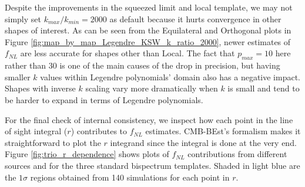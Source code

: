 Despite the improvements in the squeezed limit and local template, we may not simply set $k_{max} / k_{min} = 2000$ as default because it hurts convergence in other shapes of interest. As can be seen from the Equilateral and Orthogonal plots in Figure \ref{fig:map_by_map_Legendre_KSW_k_ratio_2000}, newer estimates of $f_{NL}$ are less accurate for shapes other than Local. The fact that $p_{max}=10$ here rather than $30$ is one of the main causes of the drop in precision, but having smaller $k$ values within Legendre polynomials' domain also has a negative impact. Shapes with inverse $k$ scaling vary more dramatically when $k$ is small and tend to be harder to expand in terms of Legendre polynomials.

For the final check of internal consistency, we inspect how each point in the line of sight integral ($r$) contributes to $f_{NL}$ estimates. CMB-BEst's formalism makes it straightforward to plot the $r$ integrand since the integral is done at the very end. Figure \ref{fig:trio_r_dependence} shows plots of $f_{NL}$ contributions from different sources and for the three standard bispectrum templates. Shaded in light blue are the $1\sigma$ regions obtained from 140 simulations for each point in $r$.

